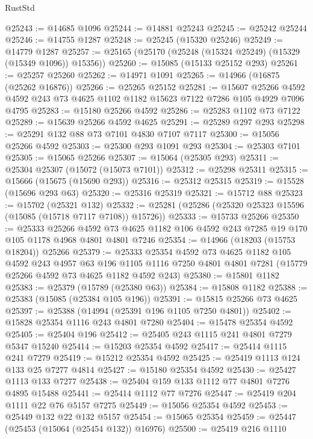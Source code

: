 \begin{lexlean}{RustStd}
\begin{coremodule}
@25243 := @14685 @1096
@25244 := @14881 @25243
@25245 := @25242 @25244
@25246 := @14755 @1287
@25248 := @25245 (@15320 @25246)
@25249 := @14779 @1287
@25257 := @25165 (@25170 (@25248 (@15324 @25249) (@15329 (@15349 @1096)) @15356))
@25260 := @15085 (@15133 @25152 @293)
@25261 := @25257 @25260
@25262 := @14971 @1091
@25265 := @14966 (@16875 (@25262 @16876))
@25266 := @25265 @25152
@25281 := @15607
    @25266
    @4592
    @4592
    @243
    @73
    @4625
    @1102
    @1182
    @15623
    @7122
    @7286
    @105
    @4929
    @7096
    @4795
@25283 := @15180 @25266 @4592
@25286 := @25283 @1102 @73 @7122
@25289 := @15639 @25266 @4592 @4625
@25291 := @25289 @297 @293
@25298 := @25291 @132 @88 @73 @7101 @4830 @7107 @7117
@25300 := @15056 @25266 @4592
@25303 := @25300 @293 @1091 @293
@25304 := @25303 @7101
@25305 := @15065 @25266
@25307 := @15064 (@25305 @293)
@25311 := @25304 @25307 (@15072 (@15073 @7101))
@25312 := @25298 @25311
@25315 := @15666 (@15675 (@15690 @293))
@25316 := @25312 @25315
@25319 := @15528 (@15696 @293 @63)
@25320 := @25316 @25319
@25321 := @15712 @88
@25323 := @15702 (@25321 @132)
@25332 := @25281 (@25286 (@25320 @25323 @15596 (@15085 (@15718 @7117 @7108)) @15726))
@25333 := @15733 @25266
@25350 := @25333
    @25266
    @4592
    @73
    @4625
    @1182
    @106
    @4592
    @243
    @7285
    @19
    @170
    @105
    @1178
    @4968
    @4801
    @4801
    @7246
@25354 := @14966 (@18203 (@15753 @18204)) @25266
@25379 := @25333
    @25354
    @4592
    @73
    @4625
    @1182
    @105
    @4592
    @243
    @4957
    @63
    @196
    @1105
    @1116
    @7250
    @4801
    @4801
    @7281
    (@15779 @25266 @4592 @73 @4625 @1182 @4592 @243)
@25380 := @15801 @1182
@25383 := @25379 (@15789 (@25380 @63))
@25384 := @15808 @1182
@25388 := @25383 (@15085 (@25384 @105 @196))
@25391 := @15815 @25266 @73 @4625
@25397 := @25388 (@14994 (@25391 @196 @1105 @7250 @4801))
@25402 := @15828 @25354 @1116 @243 @4801 @7280
@25404 := @15478 @25354 @4592
@25405 := @25404 @196
@25412 := @25405 @243 @1115 @241 @4801 @7279 @5347 @15240
@25414 := @15203 @25354 @4592
@25417 := @25414 @1115 @241 @7279
@25419 := @15212 @25354 @4592
@25425 := @25419 @1113 @124 @133 @25 @7277 @4814
@25427 := @15180 @25354 @4592
@25430 := @25427 @1113 @133 @7277
@25438 := @25404 @159 @133 @1112 @77 @4801 @7276 @4895 @15488
@25441 := @25414 @1112 @77 @7276
@25447 := @25419 @204 @1111 @22 @76 @5157 @7275
@25449 := @15056 @25354 @4592
@25453 := @25449 @132 @22 @132 @5157
@25454 := @15065 @25354
@25459 := @25447 (@25453 (@15064 (@25454 @132)) @16976)
@25500 := @25419
    @216
    @1110

\end{coremodule}
\end{lexlean}
